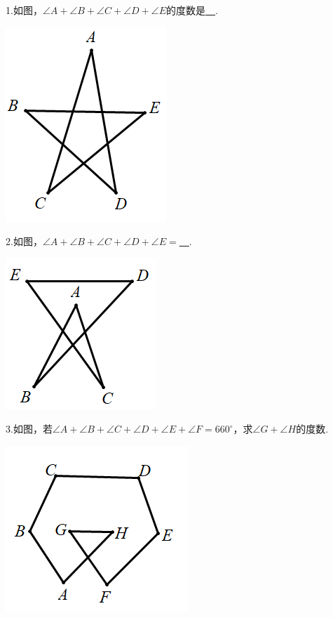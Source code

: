 \documentclass[10pt,twocolumn]{ctexart}
\begin{document}
1.如图，$\angle A+\angle B+\angle C+\angle D+\angle E$的度数是\underline{~\hspace{1cm}~}.

 \includegraphics[scale=0.5]{figure/bazhi09.PNG}
 
2.如图，$\angle A+\angle B+\angle C+\angle D+\angle E=$\underline{~\hspace{1cm}~}.

 \includegraphics[scale=0.5]{figure/bazhi10.PNG}
 
3.如图，若$\angle A+\angle B+\angle C+\angle D+\angle E+\angle F=660^\circ$，求$\angle G+\angle H$的度数.

 \includegraphics[scale=0.5]{figure/bazhi11.PNG}
 
\end{document}
